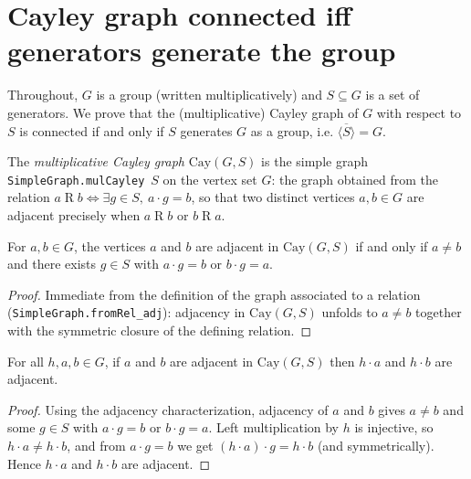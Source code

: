


\section{Cayley graph connected iff generators generate the group}

Throughout, $G$ is a group (written multiplicatively) and $S \subseteq G$ is a set
of generators. We prove that the (multiplicative) Cayley graph of $G$ with respect
to $S$ is connected if and only if $S$ generates $G$ as a group, i.e.
$\overline{\langle S \rangle} = G$.

\begin{definition}
    \label{def:cayley}
    \leanok
    The \emph{multiplicative Cayley graph} $\mathrm{Cay}(G, S)$ is the simple graph
    \texttt{SimpleGraph.mulCayley}~$S$ on the vertex set $G$: the graph obtained from
    the relation $a \mathrel{R} b \iff \exists g \in S,\ a \cdot g = b$, so that two
    distinct vertices $a, b \in G$ are adjacent precisely when $a \mathrel{R} b$ or
    $b \mathrel{R} a$.
\end{definition}

\begin{lemma}
    \label{lem:adj_iff}
    \leanok
    For $a, b \in G$, the vertices $a$ and $b$ are adjacent in $\mathrm{Cay}(G,S)$
    if and only if $a \neq b$ and there exists $g \in S$ with $a \cdot g = b$ or
    $b \cdot g = a$.
\end{lemma}
\begin{proof}
    Immediate from the definition of the graph associated to a relation
    (\texttt{SimpleGraph.fromRel\_adj}): adjacency in $\mathrm{Cay}(G,S)$ unfolds
    to $a \neq b$ together with the symmetric closure of the defining relation.
\end{proof}

\begin{lemma}
    \label{lem:adj_mul_left}
    \leanok
    For all $h, a, b \in G$, if $a$ and $b$ are adjacent in $\mathrm{Cay}(G,S)$
    then $h \cdot a$ and $h \cdot b$ are adjacent.
\end{lemma}
\begin{proof}
    Using the adjacency characterization, adjacency of $a$ and $b$ gives $a \neq b$
    and some $g \in S$ with $a \cdot g = b$ or $b \cdot g = a$. Left multiplication
    by $h$ is injective, so $h \cdot a \neq h \cdot b$, and from $a \cdot g = b$ we
    get $(h \cdot a) \cdot g = h \cdot b$ (and symmetrically). Hence $h \cdot a$ and
    $h \cdot b$ are adjacent.
\end{proof}


